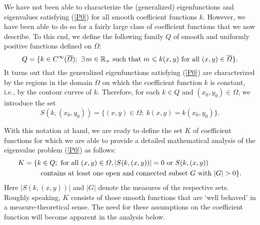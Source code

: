 \documentclass{imanum}
\begin{document}
We have not been able to characterize the (generalized)
eigenfunctions and eigenvalues satisfying (\ref{P0}) for
all smooth coefficient functions $k$. However, we have been able
to do so for a fairly large class of coefficient functions that
we now describe. To this end, we define the following family $Q$
of smooth and uniformly positive functions defined on
$\overline \Omega$:
\begin{equation*}
Q = \{k \in C^\infty (\overline \Omega );\ \exists\, m \in
\mathbb{R}_+ \hbox{ such that } m \leq k(x,y)
\hbox{ for all } (x,y) \in \overline \Omega \} .
\end{equation*}
It turns out that the generalized eigenfunctions satisfying (\ref{P0})
are characterized by the regions in the domain $\Omega$ on which
the coefficient function $k$ is constant, i.e., by the contour curves
of $k$. Therefore, for each $k \in Q$ and $(x_0,y_0) \in \Omega$, we
introduce the set
\begin{equation}
S(k,(x_0,y_0))= \{(x,y) \in \Omega ;\ k(x,y)=k(x_0,y_0)\}.
\label{P7.5}
\end{equation}

With this notation at hand, we are ready to define the set $K$ of
coefficient functions for which we are able to provide a
detailed mathematical analysis of the eigenvalue problem
(\ref{P0}) as follows:
\begin{equation}
\begin{aligned}
K & = \{ k \in Q ; \hbox{ for all } (x,y) \in \Omega,
|S(k,(x,y))|=0 \hbox{ or } S(k,(x,y)) \\
& \qquad \hbox{ contains at least one open and connected subset }
G \hbox{ with } |G| > 0 \}.
\end{aligned}
\label{P8}
\end{equation}
Here $|S(k,(x,y))|$ and $|G|$ denote the measures of the respective
sets. Roughly speaking, $K$ consists of those smooth functions that
are `well behaved' in a measure-theoretical sense.
The need for these assumptions on the coefficient function will
become apparent in the analysis below.
\end{document}

